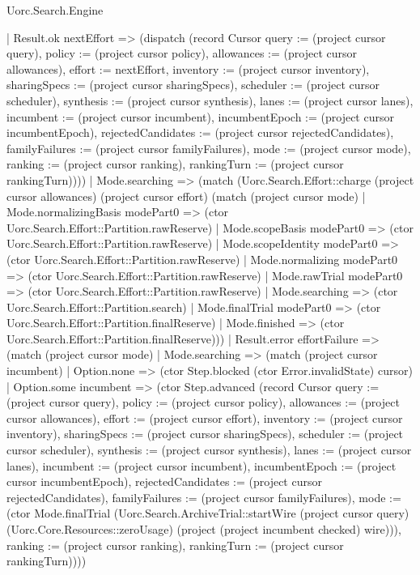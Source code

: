 \begin{lexlean}{Uorc.Search.Engine}
\begin{semanticmodule}
{      | Result.ok nextEffort => (dispatch (record Cursor {query := (project cursor query), policy := (project cursor policy), allowances := (project cursor allowances), effort := nextEffort, inventory := (project cursor inventory), sharingSpecs := (project cursor sharingSpecs), scheduler := (project cursor scheduler), synthesis := (project cursor synthesis), lanes := (project cursor lanes), incumbent := (project cursor incumbent), incumbentEpoch := (project cursor incumbentEpoch), rejectedCandidates := (project cursor rejectedCandidates), familyFailures := (project cursor familyFailures), mode := (project cursor mode), ranking := (project cursor ranking), rankingTurn := (project cursor rankingTurn)})))
    | Mode.searching => (match (Uorc.Search.Effort::charge (project cursor allowances) (project cursor effort) (match (project cursor mode)
        | Mode.normalizingBasis modePart0 => (ctor Uorc.Search.Effort::Partition.rawReserve)
        | Mode.scopeBasis modePart0 => (ctor Uorc.Search.Effort::Partition.rawReserve)
        | Mode.scopeIdentity modePart0 => (ctor Uorc.Search.Effort::Partition.rawReserve)
        | Mode.normalizing modePart0 => (ctor Uorc.Search.Effort::Partition.rawReserve)
        | Mode.rawTrial modePart0 => (ctor Uorc.Search.Effort::Partition.rawReserve)
        | Mode.searching => (ctor Uorc.Search.Effort::Partition.search)
        | Mode.finalTrial modePart0 => (ctor Uorc.Search.Effort::Partition.finalReserve)
        | Mode.finished => (ctor Uorc.Search.Effort::Partition.finalReserve)))
      | Result.error effortFailure => (match (project cursor mode)
        | Mode.searching => (match (project cursor incumbent)
          | Option.none => (ctor Step.blocked (ctor Error.invalidState) cursor)
          | Option.some incumbent => (ctor Step.advanced (record Cursor {query := (project cursor query), policy := (project cursor policy), allowances := (project cursor allowances), effort := (project cursor effort), inventory := (project cursor inventory), sharingSpecs := (project cursor sharingSpecs), scheduler := (project cursor scheduler), synthesis := (project cursor synthesis), lanes := (project cursor lanes), incumbent := (project cursor incumbent), incumbentEpoch := (project cursor incumbentEpoch), rejectedCandidates := (project cursor rejectedCandidates), familyFailures := (project cursor familyFailures), mode := (ctor Mode.finalTrial (Uorc.Search.ArchiveTrial::startWire (project cursor query) (Uorc.Core.Resources::zeroUsage) (project (project incumbent checked) wire))), ranking := (project cursor ranking), rankingTurn := (project cursor rankingTurn)})))
}
\end{semanticmodule}
\end{lexlean}

